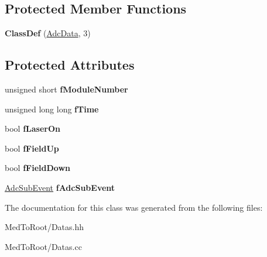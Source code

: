 \subsection*{Protected Member Functions}
\begin{DoxyCompactItemize}
\item 
\hypertarget{class_adc_data_a812ff2254bbb02418d5926644eef19da}{{\bfseries Class\-Def} (\hyperlink{class_adc_data}{Adc\-Data}, 3)}\label{class_adc_data_a812ff2254bbb02418d5926644eef19da}

\end{DoxyCompactItemize}
\subsection*{Protected Attributes}
\begin{DoxyCompactItemize}
\item 
\hypertarget{class_adc_data_a028babb7bd1b50fa8838c92c492c6be7}{unsigned short {\bfseries f\-Module\-Number}}\label{class_adc_data_a028babb7bd1b50fa8838c92c492c6be7}

\item 
\hypertarget{class_adc_data_a81a9a850671c20d546d98c8fb6689101}{unsigned long long {\bfseries f\-Time}}\label{class_adc_data_a81a9a850671c20d546d98c8fb6689101}

\item 
\hypertarget{class_adc_data_a671528f3704f4f88de8dabc3e8c4a8de}{bool {\bfseries f\-Laser\-On}}\label{class_adc_data_a671528f3704f4f88de8dabc3e8c4a8de}

\item 
\hypertarget{class_adc_data_aa410ceb4615427d21169567727116bfa}{bool {\bfseries f\-Field\-Up}}\label{class_adc_data_aa410ceb4615427d21169567727116bfa}

\item 
\hypertarget{class_adc_data_a921b19df1c84fcd656b7ed230f733529}{bool {\bfseries f\-Field\-Down}}\label{class_adc_data_a921b19df1c84fcd656b7ed230f733529}

\item 
\hypertarget{class_adc_data_ae2c539ff0e3754c9089e3715904055ae}{\hyperlink{class_adc_sub_event}{Adc\-Sub\-Event} {\bfseries f\-Adc\-Sub\-Event}}\label{class_adc_data_ae2c539ff0e3754c9089e3715904055ae}

\end{DoxyCompactItemize}


The documentation for this class was generated from the following files\-:\begin{DoxyCompactItemize}
\item 
Med\-To\-Root/Datas.\-hh\item 
Med\-To\-Root/Datas.\-cc\end{DoxyCompactItemize}
